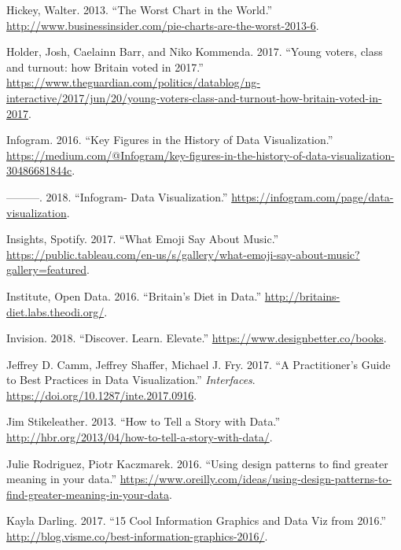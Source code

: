 \documentclass[]{book}
\theoremstyle{definition}
\theoremstyle{definition}
\theoremstyle{definition}
\theoremstyle{remark}
\begin{document}
\hypertarget{ref-hickey-pie-worst}{}
Hickey, Walter. 2013. ``The Worst Chart in the World.''
\url{http://www.businessinsider.com/pie-charts-are-the-worst-2013-6}.

\hypertarget{ref-UKvotes2017}{}
Holder, Josh, Caelainn Barr, and Niko Kommenda. 2017. ``Young voters,
class and turnout: how Britain voted in 2017.''
\url{https://www.theguardian.com/politics/datablog/ng-interactive/2017/jun/20/young-voters-class-and-turnout-how-britain-voted-in-2017}.

\hypertarget{ref-history_viz}{}
Infogram. 2016. ``Key Figures in the History of Data Visualization.''
\href{\%20https://medium.com/@Infogram/key-figures-in-the-history-of-data-visualization-30486681844c}{https://medium.com/@Infogram/key-figures-in-the-history-of-data-visualization-30486681844c}.

\hypertarget{ref-infogram}{}
---------. 2018. ``Infogram- Data Visualization.''
\href{\%20https://infogram.com/page/data-visualization}{https://infogram.com/page/data-visualization}.

\hypertarget{ref-artist_emoji}{}
Insights, Spotify. 2017. ``What Emoji Say About Music.''
\url{https://public.tableau.com/en-us/s/gallery/what-emoji-say-about-music?gallery=featured}.

\hypertarget{ref-britain_diet_2016}{}
Institute, Open Data. 2016. ``Britain's Diet in Data.''
\url{http://britains-diet.labs.theodi.org/}.

\hypertarget{ref-invision}{}
Invision. 2018. ``Discover. Learn. Elevate.''
\url{https://www.designbetter.co/books}.

\hypertarget{ref-practitioners_guide}{}
Jeffrey D. Camm, Jeffrey Shaffer, Michael J. Fry. 2017. ``A
Practitioner's Guide to Best Practices in Data Visualization.''
\emph{Interfaces}. \url{https://doi.org/10.1287/inte.2017.0916}.

\hypertarget{ref-storytelling_with_data}{}
Jim Stikeleather. 2013. ``How to Tell a Story with Data.''
\url{http://hbr.org/2013/04/how-to-tell-a-story-with-data/}.

\hypertarget{ref-greater}{}
Julie Rodriguez, Piotr Kaczmarek. 2016. ``Using design patterns to find
greater meaning in your data.''
\url{https://www.oreilly.com/ideas/using-design-patterns-to-find-greater-meaning-in-your-data}.

\hypertarget{ref-cool_data}{}
Kayla Darling. 2017. ``15 Cool Information Graphics and Data Viz from
2016.'' \url{http://blog.visme.co/best-information-graphics-2016/}.
\end{document}
